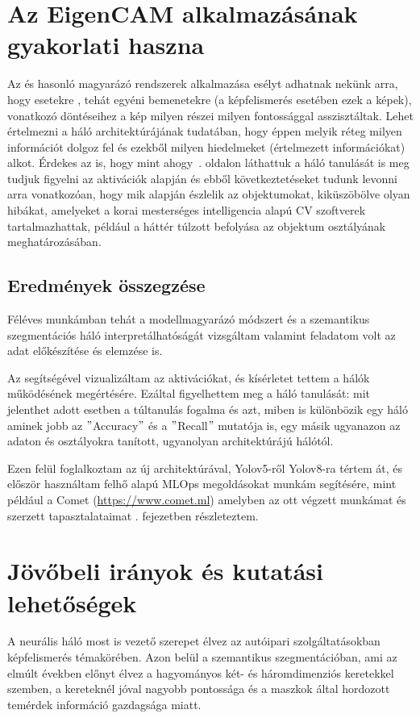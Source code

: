 \documentclass[12pt,oneside,a4paper]{article}
\newcommand{\newsection}[1]{\clearpage\section{#1}}\label{makro}
\theoremstyle{remark}
\begin{document}
\newsection{Az EigenCAM alkalmazásának gyakorlati haszna}\label{sec:az-eigencam-alkalmazasanak-gyakorlati-haszna}
    Az  és hasonló magyarázó rendszerek alkalmazása esélyt adhatnak nekünk arra, hogy esetekre
    , tehát egyéni bemenetekre (a képfelismerés esetében ezek a képek), vonatkozó döntéseihez a kép milyen részei
    milyen fontossággal asszisztáltak.
    Lehet értelmezni a háló architektúrájának tudatában, hogy éppen melyik réteg milyen információt dolgoz fel
    és ezekből milyen hiedelmeket (értelmezett információkat) alkot.
    Érdekes az is, hogy mint ahogy~\pageref{subsec:magyarazat}. oldalon láthattuk a háló tanulását is meg tudjuk
    figyelni az aktivációk alapján és ebből következtetéseket tudunk levonni arra vonatkozóan, hogy mik alapján észlelik
    az objektumokat, kiküszöbölve olyan hibákat, amelyeket a korai mesterséges intelligencia  alapú
    \ac{CV} szoftverek tartalmazhattak, például a háttér túlzott befolyása az objektum osztályának meghatározásában.

\subsection{Eredmények összegzése}\label{subsec:osszegzes-es-kovetkeztetes}
    Féléves munkámban tehát a  modellmagyarázó módszert és a 
    szemantikus szegmentációs háló interpretálhatóságát vizsgáltam valamint feladatom volt az adat előkészítése és elemzése is.

    Az  segítségével vizualizáltam az aktivációkat, és kísérletet tettem a hálók működésének megértésére.
    Ezáltal figyelhettem meg a háló tanulását: mit jelenthet adott esetben a túltanulás fogalma és azt, miben is
    különbözik egy háló aminek jobb az \("\)Accuracy\("\) és a \("\)Recall\("\) mutatója is, egy másik ugyanazon az adaton és
    osztályokra tanított, ugyanolyan architektúrájú hálótól.

    Ezen felül foglalkoztam az új architektúrával, Yolov5-ről Yolov8-ra tértem át, és először használtam felhő alapú
    \ac{MLOps} megoldásokat munkám segítésére, mint például a Comet (\url{https://www.comet.ml}) amelyben az ott végzett munkámat és szerzett tapasztalataimat . fejezetben részleteztem.

\newsection{Jövőbeli irányok és kutatási lehetőségek}\label{sec:jovobeli-iranyok-es-kutatasi-lehetosegek}
    A  neurális háló most is vezető szerepet élvez az autóipari szolgáltatásokban képfelismerés
    témakörében.
    Azon belül a szemantikus szegmentációban, ami az elmúlt években előnyt élvez
    a hagyományos  két- és háromdimenziós keretekkel szemben, a kereteknél jóval nagyobb pontossága
    és a maszkok által hordozott temérdek információ gazdagsága miatt.
\end{document}
